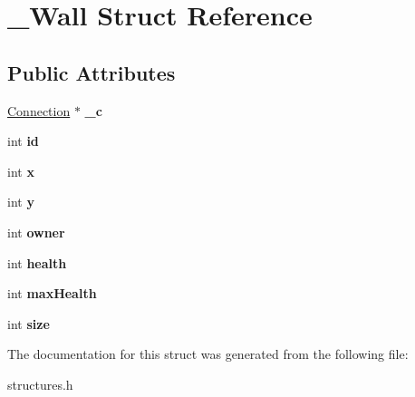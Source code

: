 \hypertarget{struct__Wall}{
\section{\_\-Wall Struct Reference}
\label{struct__Wall}
}
\subsection*{Public Attributes}
\begin{DoxyCompactItemize}
\item 
\hypertarget{struct__Wall_a9d9f882a1683125bbeae7f91bf017513}{
\hyperlink{structConnection}{Connection} $\ast$ {\bfseries \_\-c}}
\label{struct__Wall_a9d9f882a1683125bbeae7f91bf017513}

\item 
\hypertarget{struct__Wall_ab45d5e75df39dd1c1ce46094fcff0ae2}{
int {\bfseries id}}
\label{struct__Wall_ab45d5e75df39dd1c1ce46094fcff0ae2}

\item 
\hypertarget{struct__Wall_a9874d1730315014111b3cc5b0adf1725}{
int {\bfseries x}}
\label{struct__Wall_a9874d1730315014111b3cc5b0adf1725}

\item 
\hypertarget{struct__Wall_a3a947f276861813925fe7fb5d1393761}{
int {\bfseries y}}
\label{struct__Wall_a3a947f276861813925fe7fb5d1393761}

\item 
\hypertarget{struct__Wall_ab1698d232949cfe27dcac966965c82b4}{
int {\bfseries owner}}
\label{struct__Wall_ab1698d232949cfe27dcac966965c82b4}

\item 
\hypertarget{struct__Wall_aa1ca25831e2e9f1ba6d3f2abf9a48739}{
int {\bfseries health}}
\label{struct__Wall_aa1ca25831e2e9f1ba6d3f2abf9a48739}

\item 
\hypertarget{struct__Wall_ad7ebdafefe3e85746096a50b363dbbbf}{
int {\bfseries maxHealth}}
\label{struct__Wall_ad7ebdafefe3e85746096a50b363dbbbf}

\item 
\hypertarget{struct__Wall_abe74902f75abd8b76082ac94db533381}{
int {\bfseries size}}
\label{struct__Wall_abe74902f75abd8b76082ac94db533381}

\end{DoxyCompactItemize}


The documentation for this struct was generated from the following file:\begin{DoxyCompactItemize}
\item 
structures.h\end{DoxyCompactItemize}
